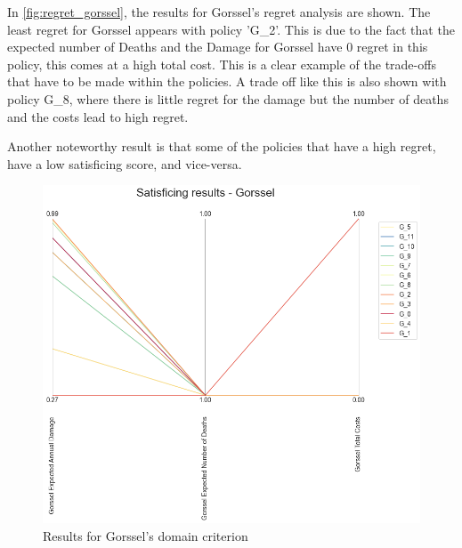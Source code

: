 \noindent In \autoref{fig:regret_gorssel}, the results for Gorssel's regret analysis are shown. The least regret for Gorssel appears with policy 'G\_2'. This is due to the fact that the expected number of Deaths and the Damage for Gorssel have 0 regret in this policy, this comes at a high total cost. This is a clear example of the trade-offs that have to be made within the policies. A trade off like this is also shown with policy G\_8, where there is little regret for the damage but the number of deaths and the costs lead to high regret.

Another noteworthy result is that some of the policies that have a high regret, have a low satisficing score, and vice-versa.

\begin{figure}[H]
  \centering
  \begin{minipage}[b]{0.4\textwidth}
    \includegraphics[width=1.15\textwidth]{report/figures/results/domain_criterion_Gorssel.png}
    \caption{Results for Gorssel's domain criterion}
    \label{fig:domain_criterion_gorssel}
  \end{minipage}
  \hfill
  \begin{minipage}[b]{0.4\textwidth}

\end{minipage}
\end{figure}
